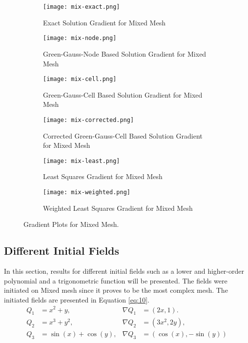 \documentclass{article}
\begin{document}
\begin{figure}[H]
  \centering
  \captionsetup{font=small}
  \begin{subfigure}{.45\textwidth}
    \centering
    \texttt{[image: mix-exact.png]}
    \caption{Exact Solution Gradient for Mixed Mesh}
    \label{fig:51}
  \end{subfigure}%
  \hfill
  \begin{subfigure}{.45\textwidth}
    \centering
    \texttt{[image: mix-node.png]}
    \caption{Green-Gauss-Node Based Solution Gradient for Mixed Mesh}
    \label{fig:52}
  \end{subfigure}

  \begin{subfigure}{.45\textwidth}
    \centering
    \texttt{[image: mix-cell.png]}
    \caption{Green-Gauss-Cell Based Solution Gradient for Mixed Mesh}
    \label{fig:53}
  \end{subfigure}%
  \hfill
  \begin{subfigure}{.45\textwidth}
    \centering
    \texttt{[image: mix-corrected.png]}
    \caption{Corrected Green-Gauss-Cell Based Solution Gradient for Mixed Mesh}
    \label{fig:54}
  \end{subfigure}

  \begin{subfigure}{.45\textwidth}
    \centering
    \texttt{[image: mix-least.png]}
    \caption{Least Squares Gradient for Mixed Mesh}
    \label{fig:55}
  \end{subfigure}%
  \hfill
  \begin{subfigure}{.45\textwidth}
    \centering
    \texttt{[image: mix-weighted.png]}
    \caption{Weighted Least Squares Gradient for Mixed Mesh}
    \label{fig:56}
  \end{subfigure}
  
  \caption{Gradient Plots for Mixed Mesh.}
  \label{fig:5}
\end{figure}
\newpage
\subsection{Different Initial Fields}
In this section, results for different initial fields such as a lower and higher-order polynomial and a trigonometric function will be presented. The fields were initiated on Mixed mesh since it proves to be the most complex mesh. The initiated fields are presented in Equation \ref{eq:10}.
\begin{equation}
\begin{aligned}
Q_1 & = x^2 + y, & \nabla Q_1 & = (2x, 1).\\
Q_2 &= x^3 + y^2, & \nabla Q_2 &= (3x^2, 2y), \\
Q_3 &= \sin(x) + \cos(y), & \nabla Q_3 & = (\cos(x), -\sin(y))
\end{aligned}
\label{eq:10}
\end{equation}
\end{document}
